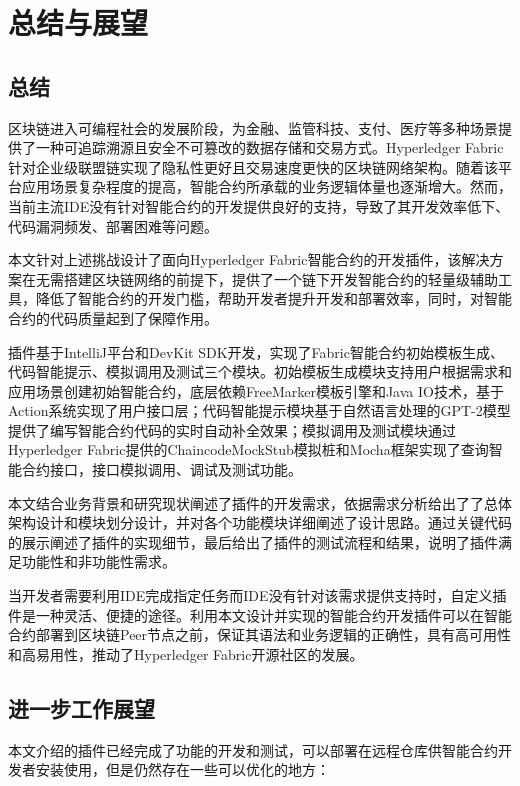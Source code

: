 \chapter{总结与展望}

\section{总结}

区块链进入可编程社会的发展阶段，为金融、监管科技、支付、医疗等多种场景提供了一种可追踪溯源且安全不可篡改的数据存储和交易方式。Hyperledger Fabric针对企业级联盟链实现了隐私性更好且交易速度更快的区块链网络架构。随着该平台应用场景复杂程度的提高，智能合约所承载的业务逻辑体量也逐渐增大。然而，当前主流IDE没有针对智能合约的开发提供良好的支持，导致了其开发效率低下、代码漏洞频发、部署困难等问题。

本文针对上述挑战设计了面向Hyperledger Fabric智能合约的开发插件，该解决方案在无需搭建区块链网络的前提下，提供了一个链下开发智能合约的轻量级辅助工具，降低了智能合约的开发门槛，帮助开发者提升开发和部署效率，同时，对智能合约的代码质量起到了保障作用。

插件基于IntelliJ平台和DevKit SDK开发，实现了Fabric智能合约初始模板生成、代码智能提示、模拟调用及测试三个模块。初始模板生成模块支持用户根据需求和应用场景创建初始智能合约，底层依赖FreeMarker模板引擎和Java IO技术，基于Action系统实现了用户接口层；代码智能提示模块基于自然语言处理的GPT-2模型提供了编写智能合约代码的实时自动补全效果；模拟调用及测试模块通过Hyperledger Fabric提供的ChaincodeMockStub模拟桩和Mocha框架实现了查询智能合约接口，接口模拟调用、调试及测试功能。

本文结合业务背景和研究现状阐述了插件的开发需求，依据需求分析给出了了总体架构设计和模块划分设计，并对各个功能模块详细阐述了设计思路。通过关键代码的展示阐述了插件的实现细节，最后给出了插件的测试流程和结果，说明了插件满足功能性和非功能性需求。

当开发者需要利用IDE完成指定任务而IDE没有针对该需求提供支持时，自定义插件是一种灵活、便捷的途径。利用本文设计并实现的智能合约开发插件可以在智能合约部署到区块链Peer节点之前，保证其语法和业务逻辑的正确性，具有高可用性和高易用性，推动了Hyperledger Fabric开源社区的发展。

\section{进一步工作展望}

本文介绍的插件已经完成了功能的开发和测试，可以部署在远程仓库供智能合约开发者安装使用，但是仍然存在一些可以优化的地方：

